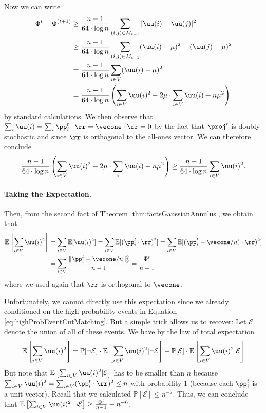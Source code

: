 Now we can write 
\begin{align*}
     \Phi^{t} - \Phi^{(t+1)} &\geq \frac{n-1}{64 \cdot \log n} \sum_{(i,j) \in M_{t+1}} |\uu(i) - \uu(j)|^2 \\
     &\geq  \frac{n-1}{64 \cdot \log n} \sum_{(i,j) \in M_{t+1}}  (\uu(i) - \mu)^2 + (\uu(j) - \mu)^2\\
     &=  \frac{n-1}{64 \cdot \log n} \sum_{i \in V}  (\uu(i) - \mu)^2\\
     &=  \frac{n-1}{64 \cdot \log n}\left( \sum_{i \in V} \uu(i)^2 - 2\mu \cdot \sum_{i \in V} \uu(i) + n \mu^2 \right)
\end{align*}
by standard calculations. We then observe that $\sum_i \uu(i) = \sum_i \pp_i^t \cdot \rr = \vecone \cdot \rr = 0$ by the fact that $\proj^t$ is doubly-stochastic and since $\rr$ is orthogonal to the all-ones vector. We can therefore conclude 
\begin{equation}\label{eq:highProbBound}
\frac{n-1}{64 \cdot \log n}\left( \sum_{i \in V} \uu(i)^2 - 2\mu \cdot \sum_i \uu(i) + n \mu^2 \right) \geq \frac{n-1}{64 \cdot \log n} \sum_{i \in V} \uu(i)^2.
\end{equation}

\paragraph{Taking the Expectation.} Then, from the second fact of Theorem \ref{thm:factsGaussianAnnulus}, we obtain that 
\begin{align}\label{eq:potentialReductionExp}
\mathbb{E}\left[\sum_{i \in V} \uu(i)^2\right] &= \sum_{i \in V} \mathbb{E}[\uu(i)^2] = \sum_{i \in V} \mathbb{E}[(\pp_i^t \cdot \rr)^2] = \sum_{i \in V} \mathbb{E}[(\pp_i^t - \vecone/n) \cdot \rr)^2] \\ &= \sum_{i \in V} \frac{\|\pp_i^t - \vecone/n\|_2^2}{n-1} = \frac{\Phi^t}{n-1}
\end{align}
where we used again that $\rr$ is orthogonal to $\vecone$.

Unfortunately, we cannot directly use this expectation since we already conditioned on the high probability events in Equation \eqref{eq:highProbEventCutMatching}. But a simple trick allows us to recover: Let $\mathcal{E}$ denote the union of all of these events. We have by the law of total expectation
\[
\mathbb{E}\left[\sum_{i \in V} \uu(i)^2 \right] = \mathbb{P}[\neg \mathcal{E}] \cdot \mathbb{E}\left[\sum_{i \in V} \uu(i)^2 | \neg \mathcal{E} \right] + \mathbb{P}[\mathcal{E}] \cdot \mathbb{E}\left[\sum_{i \in V} \uu(i)^2 | \mathcal{E} \right]
\]
But note that $\mathbb{E}\left[\sum_{i \in V} \uu(i)^2 | \mathcal{E} \right]$ has to be smaller than $n$ because $\sum_{i \in V} \uu(i)^2 = \sum_{i \in V} (\pp_i^t \cdot \rr)^2 \leq n$ with probability $1$ (because each $\pp_i^t$ is a unit vector). Recall that we calculated $\mathbb{P}[\mathcal{E}] \leq n^{-7}$. Thus, we can conclude that $\mathbb{E}\left[\sum_{i \in V} \uu(i)^2 | \neg \mathcal{E} \right] \geq \frac{\Phi^t}{n-1} - n^{-6}$.


